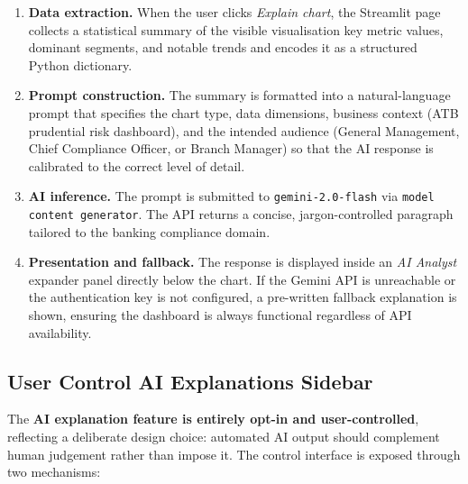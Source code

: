 \begin{enumerate}
    \item \textbf{Data extraction.} When the user clicks \emph{Explain chart},
          the Streamlit page collects a statistical summary of the visible
          visualisation key metric values, dominant segments, and notable
          trends and encodes it as a structured Python dictionary.
    \item \textbf{Prompt construction.} The summary is formatted into a
          natural-language prompt that specifies the chart type, data
          dimensions, business context (ATB prudential risk dashboard), and
          the intended audience (General Management, Chief Compliance Officer,
          or Branch Manager) so that the AI response is calibrated to the
          correct level of detail.
    \item \textbf{AI inference.} The prompt is submitted to
          \texttt{gemini-2.0-flash} via \texttt{model content generator}.
          The API returns a concise, jargon-controlled paragraph tailored
          to the banking compliance domain.
    \item \textbf{Presentation and fallback.} The response is displayed inside
          an \emph{AI Analyst} expander panel directly below the chart. If
          the Gemini API is unreachable or the authentication key is not
          configured, a pre-written fallback explanation is shown, ensuring
          the dashboard is always functional regardless of API availability.
\end{enumerate}

\subsection{User Control AI Explanations Sidebar}

The \textbf{AI explanation feature is entirely opt-in and user-controlled},
reflecting a deliberate design choice: automated AI output should complement
human judgement rather than impose it. The control interface is exposed
through two mechanisms:

